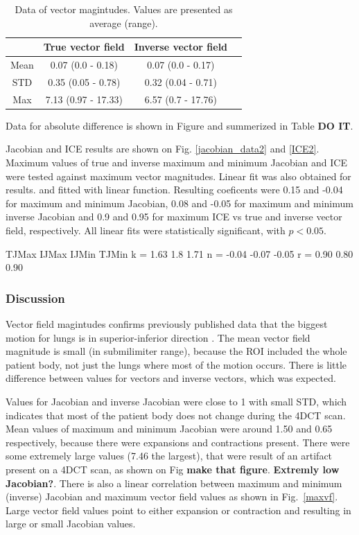 \documentclass[type=dr, dr=rernat, accentcolor=tud7b,colorbacktitle, bigchapter, openright, twoside, 12pt ]{tudthesis}
\begin{document}
\begin{table}[H]
  \centering
  \caption{Data of vector magintudes. Values are presented as average (range).}
  \begin{tabular}{c|c|c|c}
  
       & True vector field & Inverse vector field  \\
       \hline
       Mean & 0.07 (0.0 - 0.18) & 0.07 (0.0 - 0.17) \\ 
      STD & 0.35 (0.05 - 0.78) & 0.32 (0.04 - 0.71) \\ 
      Max & 7.13 (0.97 - 17.33) & 6.57 (0.7 - 17.76) \\ 

    \hline\hline
  \end{tabular}
  \label{tab:vectordata_pig}
\end{table}

Data for absolute difference is shown in Figure and summerized in Table \textbf{DO IT}.

Jacobian and ICE results are shown on Fig. \ref{jacobian_data2} and \ref{ICE2}. Maximum values of true and inverse maximum and minimum Jacobian and ICE were tested against maximum vector magnitudes. Linear fit was also obtained for results.
and fitted with linear function. Resulting coeficents were 0.15 and -0.04 for maximum and minimum Jacobian, 0.08 and -0.05 for maximum and minimum inverse Jacobian and 0.9 and 0.95 for maximum ICE vs true and inverse vector field, respectively. 
All linear fits were statistically significant, with $p < 0.05$. 

TJMax    IJMax
IJMin    TJMin
k = 1.63 1.8 1.71
n = -0.04 -0.07 -0.05
r = 0.90  0.80 0.90



\subsubsection{Discussion}


Vector field magintudes confirms previously published data that the biggest motion for lungs is in superior-inferior direction \cite{Seppenwoolde2002, Britton2007, Liu2007}. The mean vector field magnitude is small (in submilimiter range), 
because the ROI included the whole patient body, not just the lungs where most of the motion occurs. There is little difference between values for vectors and inverse vectors, which was expected.

Values for Jacobian and inverse Jacobian were close to 1 with small STD, which indicates that most of the patient body does not change during the 4DCT scan. Mean values of maximum and minimum Jacobian were around 1.50 and 0.65 respectively, because there were expansions and contractions present. There were some extremely large values (7.46 the largest), that were result of an artifact present on a 4DCT scan, as shown on Fig \textbf{make that figure}. \textbf{Extremly low Jacobian?}. There is also a linear correlation between maximum and minimum (inverse) Jacobian and maximum vector field values as shown in Fig.~\ref{maxvf}. Large vector field values point to either expansion or contraction and resulting in large or small Jacobian values.
\end{document}
